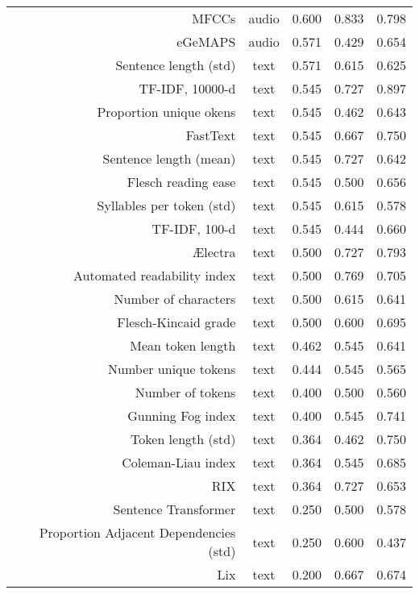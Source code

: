 \begin{tabular}{rc||ccc}
                                  MFCCs &    audio &     0.600 &      0.833 & 0.798 \\
                                eGeMAPS &    audio &     0.571 &      0.429 & 0.654 \\
                  Sentence length (std) &     text &     0.571 &      0.615 & 0.625 \\
                        TF-IDF, 10000-d &     text &     0.545 &      0.727 & 0.897 \\
                Proportion unique okens &     text &     0.545 &      0.462 & 0.643 \\
                               FastText &     text &     0.545 &      0.667 & 0.750 \\
                 Sentence length (mean) &     text &     0.545 &      0.727 & 0.642 \\
                    Flesch reading ease &     text &     0.545 &      0.500 & 0.656 \\
              Syllables per token (std) &     text &     0.545 &      0.615 & 0.578 \\
                          TF-IDF, 100-d &     text &     0.545 &      0.444 & 0.660 \\
                                Ælectra &     text &     0.500 &      0.727 & 0.793 \\
            Automated readability index &     text &     0.500 &      0.769 & 0.705 \\
                   Number of characters &     text &     0.500 &      0.615 & 0.641 \\
                   Flesch-Kincaid grade &     text &     0.500 &      0.600 & 0.695 \\
                      Mean token length &     text &     0.462 &      0.545 & 0.641 \\
                   Number unique tokens &     text &     0.444 &      0.545 & 0.565 \\
                       Number of tokens &     text &     0.400 &      0.500 & 0.560 \\
                      Gunning Fog index &     text &     0.400 &      0.545 & 0.741 \\
                     Token length (std) &     text &     0.364 &      0.462 & 0.750 \\
                     Coleman-Liau index &     text &     0.364 &      0.545 & 0.685 \\
                                    RIX &     text &     0.364 &      0.727 & 0.653 \\
                   Sentence Transformer &     text &     0.250 &      0.500 & 0.578 \\
 Proportion Adjacent Dependencies (std) &     text &     0.250 &      0.600 & 0.437 \\
                                    Lix &     text &     0.200 &      0.667 & 0.674 \\
\bottomrule
\end{tabular}
